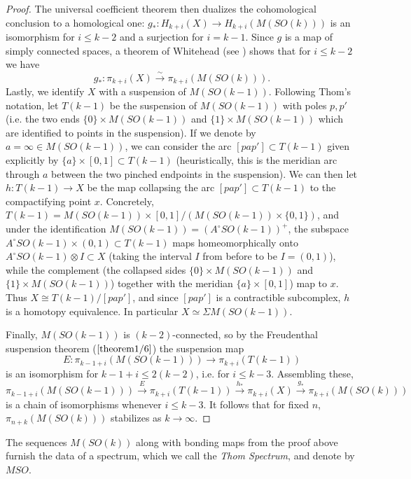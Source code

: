 \begin{proof}
    The universal coefficient theorem then dualizes the cohomological conclusion to a homological one: $g_*:H_{k+i}(X)\to H_{k+i}(M(SO(k)))$ is an isomorphism for $i\leq k-2$ and a surjection for $i=k-1$. Since $g$ is a map of simply connected spaces, a theorem of Whitehead (see {\cite[Theorem II.6]{thomQuelquesProprietesGlobales1954}}) shows that for $i\leq k-2$ we have
    \[
        g_*:\pi_{k+i}(X)\xrightarrow{\sim} \pi_{k+i}(M(SO(k))).
    \]
    Lastly, we identify $X$ with a suspension of $M(SO(k-1))$. Following Thom's notation, let $T(k-1)$ be the suspension of $M(SO(k-1))$ with poles $p,p'$ (i.e. the two ends $\{0\}\times M(SO(k-1))$ and $\{1\}\times M(SO(k-1))$ which are identified to points in the suspension). If we denote by $a=\infty\in M(SO(k-1))$, we can consider the arc $[pap']\subset T(k-1)$ given explicitly by $\{a\}\times [0,1]\subset T(k-1)$ (heuristically, this is the meridian arc through $a$ between the two pinched endpoints in the suspension). We can then let $h:T(k-1)\to X$
    be the map collapsing the arc $[pap']\subset T(k-1)$ to the compactifying point $x$. Concretely, $T(k-1)=M(SO(k-1))\times[0,1]/(M(SO(k-1))\times\{0,1\})$, and under the identification $M(SO(k-1))=(A^\circ SO(k-1))^+$, the subspace $A^\circ SO(k-1)\times (0,1)\subset T(k-1)$ maps homeomorphically onto $A^\circ SO(k-1)\otimes I\subset X$ (taking the interval $I$ from before to be $I=(0,1)$), while the complement (the collapsed sides $\{0\}\times M(SO(k-1))$ and $\{1\}\times M(SO(k-1))$) together with the meridian $\{a\}\times[0,1]$) map to $x$. Thus $X\cong T(k-1)/[pap']$, and since $[pap']$ is a contractible subcomplex, $h$ is a homotopy equivalence. In particular $X\simeq \Sigma M(SO(k-1))$.

    Finally, $M(SO(k-1))$ is $(k-2)$-connected, so by the Freudenthal suspension theorem ($\ref{theorem1/6}$) the suspension map
    \[
        E:\pi_{k-1+i}(M(SO(k-1)))\to \pi_{k+i}(T(k-1))
    \]
    is an isomorphism for $k-1+i\leq 2(k-2)$, i.e. for $i\leq k-3$. Assembling these,
    \[
        \pi_{k-1+i}(M(SO(k-1)))\xrightarrow{E}\pi_{k+i}(T(k-1))\xrightarrow{h_*}\pi_{k+i}(X)\xrightarrow{g_*}\pi_{k+i}(M(SO(k)))
    \]
    is a chain of isomorphisms whenever $i\leq k-3$. It follows that for fixed $n$, $\pi_{n+k}(M(SO(k)))$ stabilizes as $k\to\infty$.
\end{proof}

\begin{corollary}
    The sequences $M(SO(k))$ along with bonding maps from the proof above furnish the data of a spectrum, which we call the \textit{Thom Spectrum}, and denote by $MSO$.
\end{corollary}

